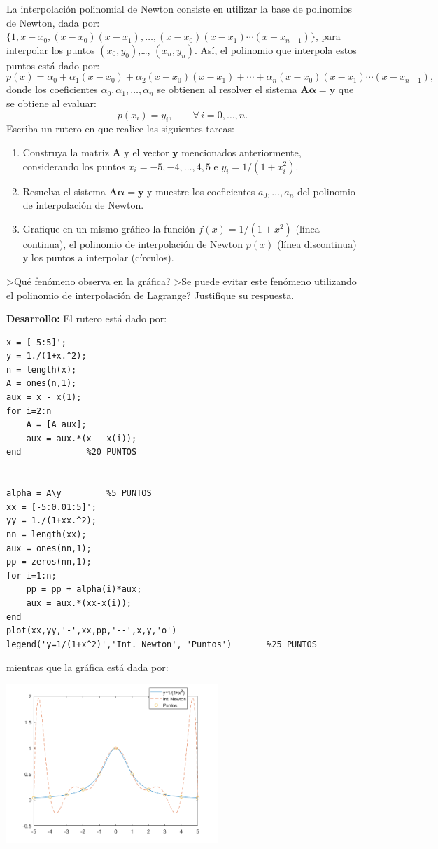 La interpolaci\'on polinomial de Newton consiste en utilizar la base de polinomios de Newton, dada por: $\{1, x-x_0, (x-x_0)(x-x_1),\ldots,(x-x_0)(x-x_1)\cdots(x-x_{n-1})\}$, para interpolar los puntos $(x_0,y_0)$,\ldots, $(x_n,y_n)$. As\'i, el polinomio que interpola estos puntos est\'a dado por:
$$
p(x)=\alpha_0+\alpha_1(x-x_0)+\alpha_2(x-x_0)(x-x_1)+\cdots+\alpha_n(x-x_0)(x-x_1)\cdots(x-x_{n-1}),
$$
donde los coeficientes $\alpha_0,\alpha_1,\ldots,\alpha_n$ se obtienen al resolver el sistema $\boldsymbol{A\alpha}=\boldsymbol{y}$ que se obtiene al evaluar:
$$
p(x_i)=y_i,\qquad \forall\,i=0,\ldots,n.
$$
Escriba un rutero en \matlab que realice las siguientes tareas:
\begin{enumerate}
\item Construya la matriz $\boldsymbol{A}$ y el vector $\boldsymbol{y}$ mencionados anteriormente, considerando los puntos $x_i=-5,-4,\ldots,4,5$ e $y_i=1/(1+x_i^2)$.
\item Resuelva el sistema $\boldsymbol{A\alpha}=\boldsymbol{y}$ y muestre los coeficientes $a_0,\ldots, a_n$ del polinomio de interpolaci\'on de Newton. 
\item Grafique en un mismo gr\'afico la funci\'on $f(x)=1/(1+x^2)$ (l\'inea continua), el polinomio de interpolaci\'on de Newton $p(x)$ (l\'inea discontinua) y los puntos a interpolar (c\'irculos).
\end{enumerate}
>Qu\'e fen\'omeno observa en la gr\'afica? >Se puede evitar este fen\'omeno utilizando el polinomio de interpolaci\'on de Lagrange? Justifique su respuesta. \bigskip

\respuesta{3cm}
\medskip

\textbf{Desarrollo:} El rutero est\'a dado por:

\begin{lstlisting}
x = [-5:5]';
y = 1./(1+x.^2);
n = length(x);
A = ones(n,1);
aux = x - x(1);
for i=2:n
    A = [A aux];
    aux = aux.*(x - x(i));
end				%20 PUNTOS


alpha = A\y			%5 PUNTOS
xx = [-5:0.01:5]';
yy = 1./(1+xx.^2);
nn = length(xx);
aux = ones(nn,1);
pp = zeros(nn,1);
for i=1:n;
    pp = pp + alpha(i)*aux;
    aux = aux.*(xx-x(i));
end
plot(xx,yy,'-',xx,pp,'--',x,y,'o')
legend('y=1/(1+x^2)','Int. Newton', 'Puntos')		%25 PUNTOS
\end{lstlisting}
mientras que la gr\'afica est\'a dada por:

\centerline{\includegraphics[width=0.6\textwidth]{inter_newton.png}}


